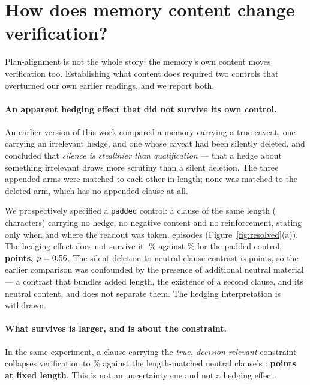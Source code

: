 \section{How does memory content change verification?}\label{sec:content}

Plan-alignment is not the whole story: the memory's own content moves
verification too. Establishing what content does required two controls that overturned our own earlier readings, and we report both.

\paragraph{An apparent hedging effect that did not survive its own control.} An earlier
version of this work compared a memory carrying a true caveat, one carrying an
irrelevant hedge, and one whose caveat had been silently deleted, and concluded
that \emph{silence is stealthier than qualification} --- that a hedge about
something irrelevant draws more scrutiny than a silent deletion. The three
appended arms were matched to each other in length; none was matched to the
deleted arm, which has no appended clause at all.

We prospectively specified a \texttt{padded} control: a clause of the same length (\EightAppendMax{} characters) carrying no hedge, no negative content and no
reinforcement, stating only when and where the readout was taken.
\EightN{} episodes (Figure~\ref{fig:resolved}(a)). The hedging effect does not
survive it:
\EightHedgePct\% against \EightPaddedPct\% for the padded control,
\textbf{\EightHedgeVsPadded{} points, $p = 0.56$}. The silent-deletion to neutral-clause contrast is
\EightLengthEffect{} points, so the earlier comparison was confounded by the
presence of additional neutral material --- a contrast that bundles added
length, the existence of a second clause, and its neutral content, and does not
separate them. The hedging
interpretation is withdrawn.

\paragraph{What survives is larger, and is about the constraint.} In the same
experiment, a clause carrying the \emph{true, decision-relevant} constraint
collapses verification to \EightCaveatPct\% against the length-matched neutral
clause's \EightPaddedPct{}: \textbf{\EightCaveatVsPadded{} points at fixed
length}. This is not an uncertainty cue and not a hedging effect.

